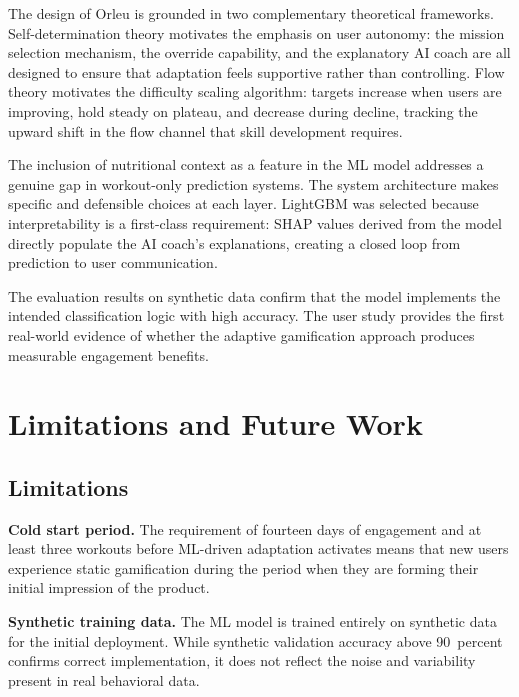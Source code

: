 \documentclass[12pt, a4paper]{report}
\begin{document}
The design of Orleu is grounded in two complementary theoretical frameworks. Self-determination theory motivates the emphasis on user autonomy: the mission selection mechanism, the override capability, and the explanatory AI coach are all designed to ensure that adaptation feels supportive rather than controlling. Flow theory motivates the difficulty scaling algorithm: targets increase when users are improving, hold steady on plateau, and decrease during decline, tracking the upward shift in the flow channel that skill development requires.

The inclusion of nutritional context as a feature in the ML model addresses a genuine gap in workout-only prediction systems. The system architecture makes specific and defensible choices at each layer. LightGBM was selected because interpretability is a first-class requirement: SHAP values derived from the model directly populate the AI coach's explanations, creating a closed loop from prediction to user communication.

The evaluation results on synthetic data confirm that the model implements the intended classification logic with high accuracy. The user study provides the first real-world evidence of whether the adaptive gamification approach produces measurable engagement benefits.

\chapter{Limitations and Future Work}
\label{ch:limitations}

\section{Limitations}

\textbf{Cold start period.} The requirement of fourteen days of engagement and at least three workouts before ML-driven adaptation activates means that new users experience static gamification during the period when they are forming their initial impression of the product.

\textbf{Synthetic training data.} The ML model is trained entirely on synthetic data for the initial deployment. While synthetic validation accuracy above 90~percent confirms correct implementation, it does not reflect the noise and variability present in real behavioral data.
\end{document}
